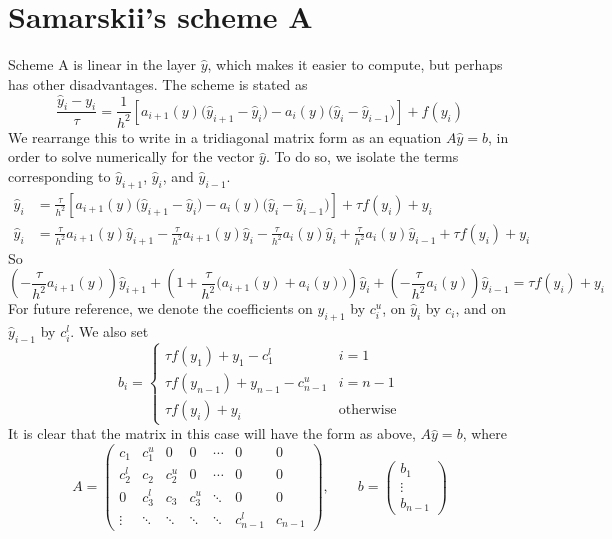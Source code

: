 \documentclass[12pt, reqno]{amsart}
\begin{document}
\section{Samarskii's scheme A}
Scheme A is linear in the layer $\hat{y}$, which makes it easier to compute, but perhaps has other disadvantages.
The scheme is stated as
\begin{equation}
  \frac{\hat{y}_{i}-y_{i}}{\tau}=\frac{1}{h^{2}}\left[a_{i+1}(y)\big( \hat{y}_{i+1}-\hat{y}_{i}\big) - a_{i}(y)\big(\hat{y}_{i}-\hat{y}_{i-1}\big) \right] + f(y_{i})\label{eq:scheme-a}
\end{equation}
We rearrange this to write in a tridiagonal matrix form as an equation $A \hat{y}=b$, in order to solve numerically for the vector $\hat{y}$.
To do so, we isolate the terms corresponding to $\hat{y}_{i+1}$, $\hat{y}_{i}$, and $\hat{y}_{i-1}$.
\begin{align*}
  \hat{y}_{i} & =\frac{\tau}{h^{2}}\left[a_{i+1}(y)\big( \hat{y}_{i+1}-\hat{y}_{i}\big) - a_{i}(y)\big(\hat{y}_{i}-\hat{y}_{i-1}\big) \right] + \tau f(y_{i})+y_{i}
  \\
  \hat{y}_{i} & = \frac{\tau}{h^{2}}a_{i+1}(y)\hat{y}_{i+1}-\frac{\tau}{h^{2}}a_{i+1}(y)\hat{y}_{i}- \frac{\tau}{h^{2}}a_{i}(y)\hat{y}_{i}+ \frac{\tau}{h^{2}}a_{i}(y)\hat{y}_{i-1} + \tau f(y_{i}) +y_{i}
\end{align*}
So
\[
  \left(- \frac{\tau}{h^{2}}a_{i+1}(y)\right)\hat{y}_{i+1}+\left(1+\frac{\tau}{h^{2}}\big(a_{i+1}(y)+ a_{i}(y)\big)\right)\hat{y}_{i}+\left(- \frac{\tau}{h^{2}}a_{i}(y)\right)\hat{y}_{i-1} = \tau f(y_{i}) +y_{i}
\]
For future reference, we denote the coefficients on $\hat{y}_{i+1}$ by $c^{u}_{i}$, on $\hat{y}_{i}$ by $c_{i}$, and on $\hat{y}_{i-1}$ by $c^{l}_{i}$.
We also set
\[
  b_{i}=\begin{cases}
    \tau f(y_{1}) + y_{1} - c_{1}^{l}       & i=1              \\
    \tau f(y_{n-1}) + y_{n-1} - c_{n-1}^{u} & i=n-1            \\
    \tau f(y_{i}) + y_{i}                   & \text{otherwise}
  \end{cases}
\]
It is clear that the matrix in this case will have the form as above, $A \hat{y}=b$, where
\[
  A=\begin{pmatrix}
    c_{1}     & c^{u}_{1} & 0         & 0         & \cdots & 0           & 0       \\
    c^{l}_{2} & c_{2}     & c^{u}_{2} & 0         & \cdots & 0           & 0       \\
    0         & c^{l}_{3} & c_{3}     & c^{u}_{3} & \ddots & 0           & 0       \\
    \vdots    & \ddots    & \ddots    & \ddots    & \ddots & c_{n-1}^{l} & c_{n-1}
  \end{pmatrix},\qquad
  b=\begin{pmatrix}
    b_{1} \\ \vdots \\ b_{n-1}
  \end{pmatrix}
\]
\end{document}
